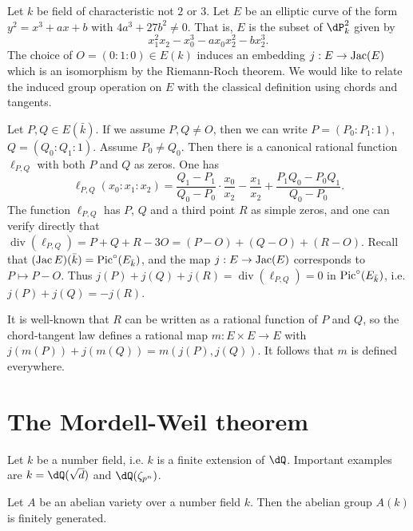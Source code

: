\documentclass{article}
\begin{document}
\begin{example}
Let $k$ be field of characteristic not $2$ or $3$. Let $E$ be an elliptic curve 
of the form $y^2=x^3+a x+b$ with $4 a^3+27 b^2\ne 0$. That is, $E$ is the 
subset of $\dP_k^2$ given by 
\[
  x_1^2 x_2 - x_0^3 - a x_0 x_2^2 - b x_2^3 \text{.}
\]
The choice of $O=(0:1:0)\in E(k)$ induces an embedding $j:E\to \operatorname{Jac}(E)$ which 
is an isomorphism by the Riemann-Roch theorem. We would like to relate the 
induced group operation on $E$ with the classical definition using chords and 
tangents. 

Let $P,Q\in E(\bar k)$. If we assume $P,Q\ne O$, then we can write 
$P=(P_0:P_1:1)$, $Q=(Q_0:Q_1:1)$. Assume $P_0\ne Q_0$. Then there is a 
canonical rational function $\ell_{P,Q}$ with both $P$ and $Q$ as zeros. One 
has  
\[
 \ell_{P,Q}(x_0:x_1:x_2) = \frac{Q_1-P_1}{Q_0-P_0} \cdot \frac{x_0}{x_2} - \frac{x_1}{x_2} + \frac{P_1 Q_0 - P_0 Q_1}{Q_0-P_0} \text{.}
\]
The function $\ell_{P,Q}$ has $P$, $Q$ and a third point $R$ as simple zeros, 
and one can verify directly that 
$\operatorname{div}(\ell_{P,Q})=P+Q+R-3 O = (P-O)+(Q-O)+(R-O)$. Recall that 
$(\operatorname{Jac} E)(\bar k)=\operatorname{Pic}^\circ(E_{\bar k})$, and the map $j:E\to \operatorname{Jac}(E)$ 
corresponds to $P\mapsto P-O$. Thus 
$j(P)+j(Q)+j(R)=\operatorname{div}(\ell_{P,Q})=0$ in 
$\operatorname{Pic}^\circ(E_{\bar k})$, i.e. $j(P)+j(Q)=-j(R)$. 

It is well-known that $R$ can be written as a rational function of $P$ and $Q$, 
so the chord-tangent law defines a rational map $m:E\times E\to E$ with 
$j(m(P))+j(m(Q))=m(j(P),j(Q))$. It follows that $m$ is defined everywhere. 
\end{example}










\section{The Mordell-Weil theorem}

Let $k$ be a number field, i.e. $k$ is a finite extension of $\dQ$. Important 
examples are $k=\dQ(\sqrt d)$ and $\dQ(\zeta_{p^n})$. 

\begin{theorem}
Let $A$ be an abelian variety over a number field $k$. Then the abelian group 
$A(k)$ is finitely generated.
\end{theorem}
\end{document}
